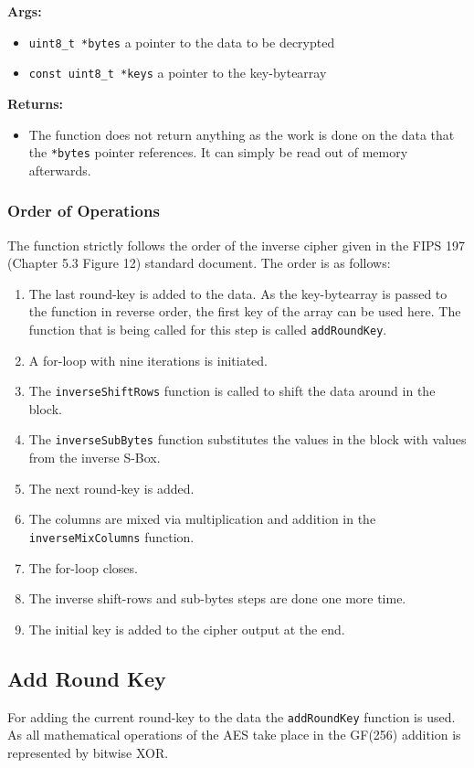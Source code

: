 \textbf{Args:}
\begin{itemize}
  \item \lstinline{uint8_t *bytes} a pointer to the data to be decrypted
  \item \lstinline{const uint8_t *keys} a pointer to the key-bytearray
\end{itemize}

\textbf{Returns:}
\begin{itemize}
  \item The function does not return anything as the work is done on the data that the \lstinline{*bytes} pointer references. It can simply be read out of memory afterwards.
\end{itemize}

\subsubsection{Order of Operations}
The function strictly follows the order of the inverse cipher given in the FIPS 197 (Chapter 5.3 Figure 12) standard document. The order is as follows:
\begin{enumerate}
  \item The last round-key is added to the data. As the key-bytearray is passed to the function in reverse order, the first key of the array can be used here. The function that is being called for this step is called \lstinline{addRoundKey}.
  \item A for-loop with nine iterations is initiated.
  \item The \lstinline{inverseShiftRows} function is called to shift the data around in the block.
  \item The \lstinline{inverseSubBytes} function substitutes the values in the block with values from the inverse S-Box.
  \item The next round-key is added.
  \item The columns are mixed via multiplication and addition in the \lstinline{inverseMixColumns} function.
  \item The for-loop closes.
  \item The inverse shift-rows and sub-bytes steps are done one more time.
  \item The initial key is added to the cipher output at the end.
\end{enumerate}


\subsection{Add Round Key}
\label{ch:dec_addroundkey}
For adding the current round-key to the data the \lstinline{addRoundKey} function is used. As all mathematical operations of the AES take place in the GF(256) addition is represented by bitwise XOR.


